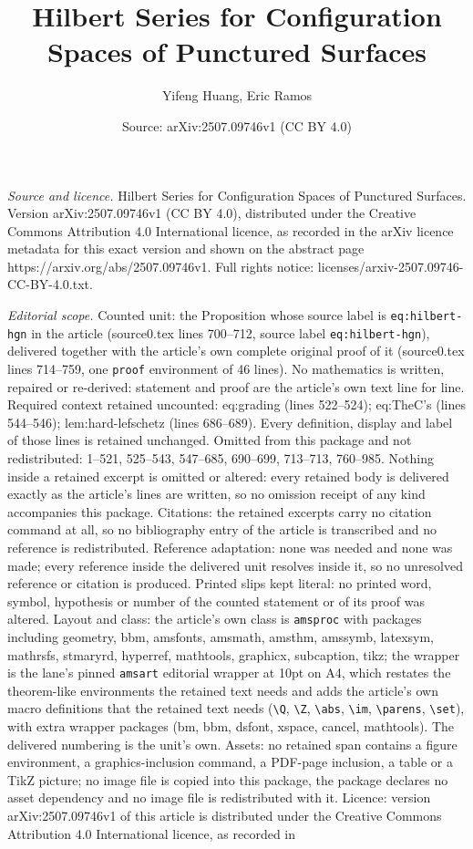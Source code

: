\documentclass[10pt,a4paper]{amsart}
\title[Hilbert Series for Configuration Spaces of Punctured Surface]{Hilbert Series for Configuration Spaces of Punctured Surfaces}
\author{Yifeng Huang, Eric Ramos}
\date{Source: arXiv:2507.09746v1 (CC BY 4.0)}
\begin{document}
\maketitle

\noindent\emph{Source and licence.} Hilbert Series for Configuration Spaces of Punctured Surfaces. Version arXiv:2507.09746v1 (CC BY 4.0), distributed under the Creative Commons Attribution 4.0 International licence, as recorded in the arXiv licence metadata for this exact version and shown on the abstract page https://arxiv.org/abs/2507.09746v1. Full rights notice: licenses/arxiv-2507.09746-CC-BY-4.0.txt.\par\smallskip

\noindent\textit{Editorial scope.} Counted unit: the Proposition whose source label is \texttt{eq:hilbert-hgn} in the article (source0.tex lines 700--712, source label \texttt{eq:hilbert-hgn}), delivered together with the article's own complete original proof of it (source0.tex lines 714--759, one \texttt{proof} environment of 46 lines). No mathematics is written, repaired or re-derived: statement and proof are the article's own text line for line. Required context retained uncounted: eq:grading (lines 522--524); eq:TheC's (lines 544--546); lem:hard-lefschetz (lines 686--689). Every definition, display and label of those lines is retained unchanged. Omitted from this package and not redistributed: 1--521, 525--543, 547--685, 690--699, 713--713, 760--985. Nothing inside a retained excerpt is omitted or altered: every retained body is delivered exactly as the article's lines are written, so no omission receipt of any kind accompanies this package. Citations: the retained excerpts carry no citation command at all, so no bibliography entry of the article is transcribed and no reference is redistributed. Reference adaptation: none was needed and none was made; every reference inside the delivered unit resolves inside it, so no unresolved reference or citation is produced. Printed slips kept literal: no printed word, symbol, hypothesis or number of the counted statement or of its proof was altered. Layout and class: the article's own class is \texttt{amsproc} with packages including geometry, bbm, amsfonts, amsmath, amsthm, amssymb, latexsym, mathrsfs, stmaryrd, hyperref, mathtools, graphicx, subcaption, tikz; the wrapper is the lane's pinned \texttt{amsart} editorial wrapper at 10pt on A4, which restates the theorem-like environments the retained text needs and adds the article's own macro definitions that the retained text needs (\texttt{\textbackslash Q}, \texttt{\textbackslash Z}, \texttt{\textbackslash abs}, \texttt{\textbackslash im}, \texttt{\textbackslash parens}, \texttt{\textbackslash set}), with extra wrapper packages (bm, bbm, dsfont, xspace, cancel, mathtools). The delivered numbering is the unit's own. Assets: no retained span contains a figure environment, a graphics-inclusion command, a PDF-page inclusion, a table or a TikZ picture; no image file is copied into this package, the package declares no asset dependency and no image file is redistributed with it. Licence: version arXiv:2507.09746v1 of this article is distributed under the Creative Commons Attribution 4.0 International licence, as recorded in 
\end{document}
